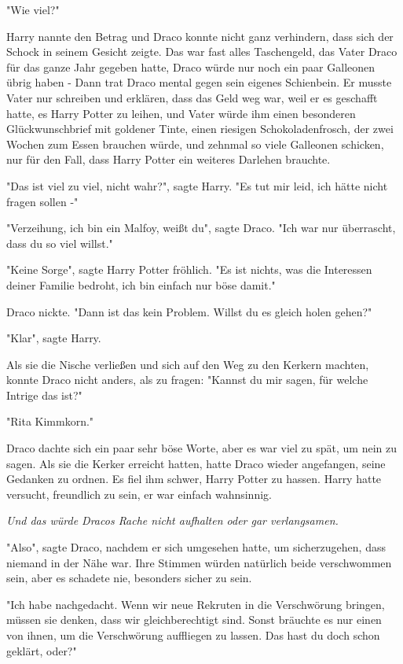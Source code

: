 {"Wie viel?"

Harry nannte den Betrag und Draco konnte nicht ganz verhindern, dass sich der Schock in seinem Gesicht zeigte. Das war fast alles Taschengeld, das Vater Draco für das ganze Jahr gegeben hatte, Draco würde nur noch ein paar Galleonen übrig haben - Dann trat Draco mental gegen sein eigenes Schienbein. Er musste Vater nur schreiben und erklären, dass das Geld weg war, weil er es geschafft hatte, es Harry Potter zu leihen, und Vater würde ihm einen besonderen Glückwunschbrief mit goldener Tinte, einen riesigen Schokoladenfrosch, der zwei Wochen zum Essen brauchen würde, und zehnmal so viele Galleonen schicken, nur für den Fall, dass Harry Potter ein weiteres Darlehen brauchte.

"Das ist viel zu viel, nicht wahr?", sagte Harry. "Es tut mir leid, ich hätte nicht fragen sollen -"

"Verzeihung, ich bin ein Malfoy, weißt du", sagte Draco. "Ich war nur überrascht, dass du so viel willst."

"Keine Sorge", sagte Harry Potter fröhlich. "Es ist nichts, was die Interessen deiner Familie bedroht, ich bin einfach nur böse damit."

Draco nickte. "Dann ist das kein Problem. Willst du es gleich holen gehen?"

"Klar", sagte Harry.

Als sie die Nische verließen und sich auf den Weg zu den Kerkern machten, konnte Draco nicht anders, als zu fragen: "Kannst du mir sagen, für welche Intrige das ist?"

"Rita Kimmkorn."

Draco dachte sich ein paar sehr böse Worte, aber es war viel zu spät, um nein zu sagen. Als sie die Kerker erreicht hatten, hatte Draco wieder angefangen, seine Gedanken zu ordnen. Es fiel ihm schwer, Harry Potter zu hassen. Harry hatte versucht, freundlich zu sein, er war einfach wahnsinnig.

\emph{Und das würde Dracos Rache nicht aufhalten oder gar verlangsamen.}

"Also", sagte Draco, nachdem er sich umgesehen hatte, um sicherzugehen, dass niemand in der Nähe war. Ihre Stimmen würden natürlich beide verschwommen sein, aber es schadete nie, besonders sicher zu sein.

"Ich habe nachgedacht. Wenn wir neue Rekruten in die Verschwörung bringen, müssen sie denken, dass wir gleichberechtigt sind. Sonst bräuchte es nur einen von ihnen, um die Verschwörung auffliegen zu lassen. Das hast du doch schon geklärt, oder?"

}
